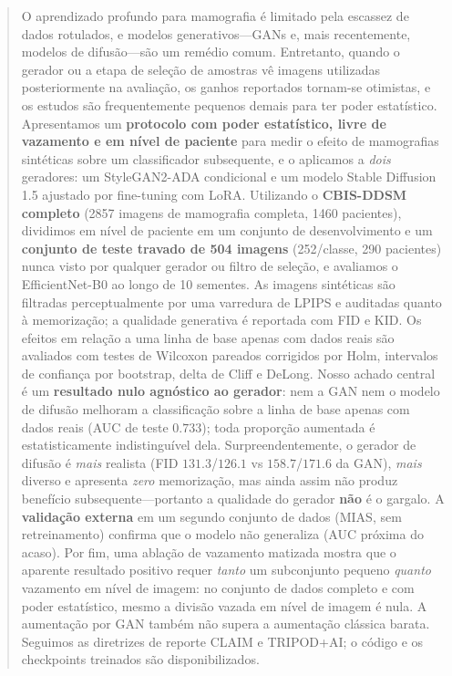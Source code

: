 \documentclass[runningheads]{llncs}
\begin{document}
\begin{abstract}
O aprendizado profundo para mamografia é limitado pela escassez de dados
rotulados, e modelos generativos---GANs e, mais recentemente, modelos de
difusão---são um remédio comum. Entretanto, quando o gerador ou a etapa de
seleção de amostras vê imagens utilizadas posteriormente na avaliação, os ganhos
reportados tornam-se otimistas, e os estudos são frequentemente pequenos demais
para ter poder estatístico. Apresentamos um \textbf{protocolo com poder
estatístico, livre de vazamento e em nível de paciente} para medir o efeito de
mamografias sintéticas sobre um classificador subsequente, e o aplicamos a
\emph{dois} geradores: um StyleGAN2-ADA condicional e um modelo Stable
Diffusion 1.5 ajustado por fine-tuning com LoRA. Utilizando o \textbf{CBIS-DDSM
completo} (2857 imagens de mamografia completa, 1460 pacientes), dividimos em
nível de paciente em um conjunto de desenvolvimento e um \textbf{conjunto de
teste travado de 504 imagens} (252/classe, 290 pacientes) nunca visto por
qualquer gerador ou filtro de seleção, e avaliamos o EfficientNet-B0 ao longo de
10 sementes. As imagens sintéticas são filtradas perceptualmente por uma
varredura de LPIPS e auditadas quanto à memorização; a qualidade generativa é
reportada com FID e KID. Os efeitos em relação a uma linha de base apenas com
dados reais são avaliados com testes de Wilcoxon pareados corrigidos por Holm,
intervalos de confiança por bootstrap, delta de Cliff e DeLong. Nosso achado
central é um \textbf{resultado nulo agnóstico ao gerador}: nem a GAN nem o modelo
de difusão melhoram a classificação sobre a linha de base apenas com dados reais
(AUC de teste $0.733$); toda proporção aumentada é estatisticamente
indistinguível dela. Surpreendentemente, o gerador de difusão é \emph{mais}
realista (FID $131.3$/$126.1$ vs $158.7$/$171.6$ da GAN), \emph{mais} diverso e
apresenta \emph{zero} memorização, mas ainda assim não produz benefício
subsequente---portanto a qualidade do gerador \textbf{não} é o gargalo. A
\textbf{validação externa} em um segundo conjunto de dados (MIAS, sem
retreinamento) confirma que o modelo não generaliza (AUC próxima do acaso). Por
fim, uma ablação de vazamento matizada mostra que o aparente resultado positivo
requer \emph{tanto} um subconjunto pequeno \emph{quanto} vazamento em nível de
imagem: no conjunto de dados completo e com poder estatístico, mesmo a divisão
vazada em nível de imagem é nula. A aumentação por GAN também não supera a
aumentação clássica barata. Seguimos as diretrizes de reporte CLAIM e TRIPOD+AI;
o código e os checkpoints treinados são disponibilizados.

\end{abstract}
\end{document}
